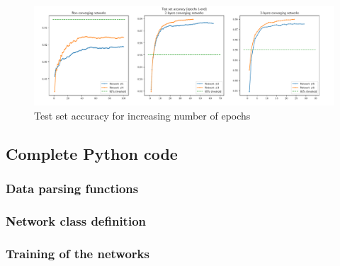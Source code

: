 \documentclass[letterpaper,headings=standardclasses]{scrartcl}
\begin{document}
\begin{figure}[H]
    \centering
    \includegraphics[width=\linewidth]{tests.pdf}
    \caption{Test set accuracy for increasing number of epochs}
    \label{tests_plot}
\end{figure}

\subsection{Complete Python code}

\subsubsection{Data parsing functions}



\subsubsection{Network class definition}



\subsubsection{Training of the networks}


\end{document}

